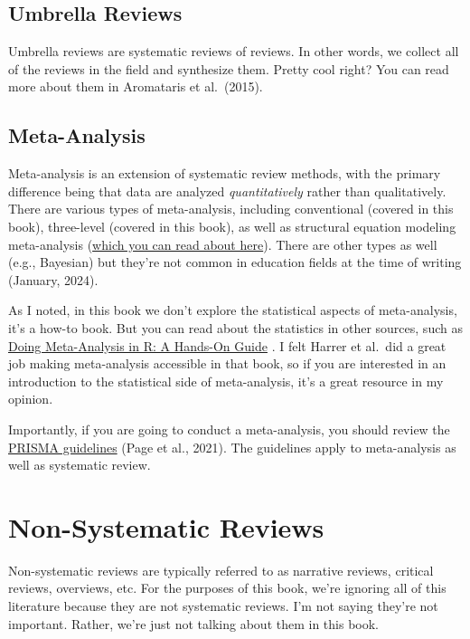 \documentclass[
]{book}
\begin{document}
\hypertarget{umbrella-reviews}{%
\subsection{Umbrella Reviews}\label{umbrella-reviews}}

Umbrella reviews are systematic reviews of reviews. In other words, we collect all of the reviews in the field and synthesize them. Pretty cool right? You can read more about them in Aromataris et al.~(2015)\citep{aromataris2015}.

\hypertarget{meta-analysis}{%
\subsection{Meta-Analysis}\label{meta-analysis}}

Meta-analysis is an extension of systematic review methods, with the primary difference being that data are analyzed \emph{quantitatively} rather than qualitatively. There are various types of meta-analysis, including conventional (covered in this book), three-level (covered in this book), as well as structural equation modeling meta-analysis (\href{http://www.suzannejak.nl/MASEM_SJak.pdf}{which you can read about here}). There are other types as well (e.g., Bayesian) but they're not common in education fields at the time of writing (January, 2024).

As I noted, in this book we don't explore the statistical aspects of meta-analysis, it's a how-to book. But you can read about the statistics in other sources, such as \href{https://bookdown.org/MathiasHarrer/Doing_Meta_Analysis_in_R/}{Doing Meta-Analysis in R: A Hands-On Guide} \citep{harrer2021}. I felt Harrer et al.~did a great job making meta-analysis accessible in that book, so if you are interested in an introduction to the statistical side of meta-analysis, it's a great resource in my opinion.

Importantly, if you are going to conduct a meta-analysis, you should review the \href{http://www.prisma-statement.org/}{PRISMA guidelines} (Page et al., 2021)\citep{page2021}. The guidelines apply to meta-analysis as well as systematic review.

\hypertarget{non-systematic-reviews}{%
\section{Non-Systematic Reviews}\label{non-systematic-reviews}}

Non-systematic reviews are typically referred to as narrative reviews, critical reviews, overviews, etc. For the purposes of this book, we're ignoring all of this literature because they are not systematic reviews. I'm not saying they're not important. Rather, we're just not talking about them in this book.
\end{document}
